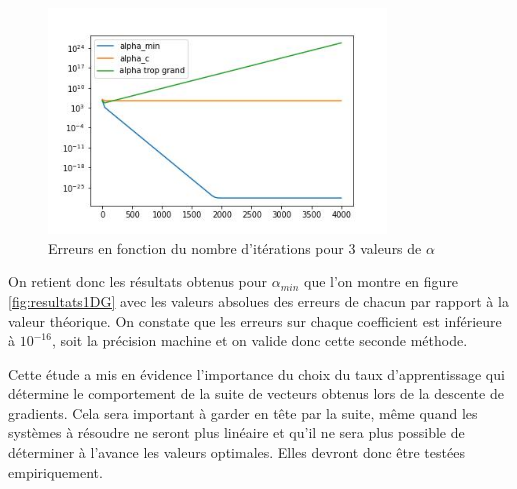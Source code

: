 \documentclass[12pt]{report}
\begin{document}
\begin{figure}
    \centering
    \includegraphics[width=0.8\textwidth]{comparaison_erreurs_selon_alpha_1D.jpg}
    \caption{Erreurs en fonction du nombre d'itérations pour 3 valeurs de $\alpha$}
    \label{fig:erreur_selon_alpha}
\end{figure}


On retient donc les résultats obtenus pour $\alpha_{min}$ que l'on montre en figure \ref{fig:resultats1DG} avec les valeurs absolues des erreurs de chacun par rapport à la valeur théorique.
On constate que les erreurs sur chaque coefficient est inférieure à $10^{-16}$, soit la précision machine et on valide donc cette seconde méthode.

Cette étude a mis en évidence l'importance du choix du taux d'apprentissage qui détermine le comportement de la suite de vecteurs obtenus lors de la descente de gradients.
Cela sera important à garder en tête par la suite, même quand les systèmes à résoudre ne seront plus linéaire et qu'il ne sera plus possible de déterminer à l'avance les valeurs optimales.
Elles devront donc être testées empiriquement.
\end{document}
